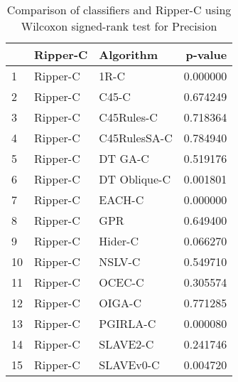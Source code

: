 \begin{table}
\footnotesize
\caption{Comparison of classifiers and Ripper-C using Wilcoxon signed-rank test for Precision}
\label{tab:Ripper-C wilcoxon Precision comparison}
\begin{tabular}{lllr}
\hline
 & Ripper-C & Algorithm & p-value \\
\hline
1 & Ripper-C & 1R-C & 0.000000 \\
2 & Ripper-C & C45-C & 0.674249 \\
3 & Ripper-C & C45Rules-C & 0.718364 \\
4 & Ripper-C & C45RulesSA-C & 0.784940 \\
5 & Ripper-C & DT GA-C & 0.519176 \\
6 & Ripper-C & DT Oblique-C & 0.001801 \\
7 & Ripper-C & EACH-C & 0.000000 \\
8 & Ripper-C & GPR & 0.649400 \\
9 & Ripper-C & Hider-C & 0.066270 \\
10 & Ripper-C & NSLV-C & 0.549710 \\
11 & Ripper-C & OCEC-C & 0.305574 \\
12 & Ripper-C & OIGA-C & 0.771285 \\
13 & Ripper-C & PGIRLA-C & 0.000080 \\
14 & Ripper-C & SLAVE2-C & 0.241746 \\
15 & Ripper-C & SLAVEv0-C & 0.004720 \\
\hline
\end{tabular}
\end{table}
